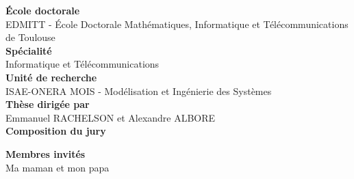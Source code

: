 \documentclass[a4paper,12pt]{article}
\begin{document}
\begin{flushleft}
    \textbf{\large \textbf{École doctorale}} \\
    {\Large EDMITT - École Doctorale Mathématiques, Informatique et Télécommunications de Toulouse} \\[0.5cm]
    
    \textbf{\large \textbf{Spécialité}} \\
    {\Large Informatique et Télécommunications} \\[0.5cm]
    
    \textbf{\large \textbf{Unité de recherche}} \\
    {\Large ISAE-ONERA MOIS - Modélisation et Ingénierie des Systèmes} \\[2cm]
    
    \textbf{\large Thèse dirigée par} \\
    {\Large Emmanuel RACHELSON et Alexandre ALBORE} \\[2cm]
    
    \textbf{\large Composition du jury} \\
    {\begin{tabbing}
    \end{tabbing}}
    
    \textbf{\large Membres invités} \\
    {\Large Ma maman et mon papa} 
\end{flushleft}
\end{document}
